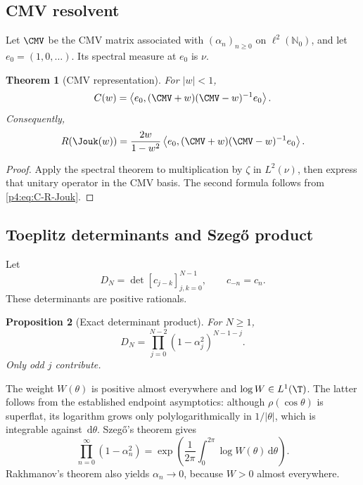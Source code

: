 \documentclass[11pt,oneside]{article}
\newtheorem{theorem}{Theorem}[section]
\newtheorem{proposition}[theorem]{Proposition}
\theoremstyle{definition}
\newcommand{\dd}{\,\mathrm d}
\newcommand{\N}{\mathbb N}
\begin{document}
\subsection{CMV resolvent}

Let \(\CMV\) be the CMV matrix associated with \((\alpha_n)_{n\ge0}\) on
\(\ell^2(\N_0)\), and let \(e_0=(1,0,\ldots)\). Its spectral measure at \(e_0\) is \(\nu\).

\begin{theorem}[CMV representation]
\label{p4:thm:CMV}
For \(|w|<1\),
\begin{equation}
 C(w)=\left\langle e_0,(\CMV+w)(\CMV-w)^{-1}e_0\right\rangle.
 \label{p4:eq:C-CMV}
\end{equation}
Consequently,
\begin{equation}
 R(\Jouk(w))=\frac{2w}{1-w^2}
 \left\langle e_0,(\CMV+w)(\CMV-w)^{-1}e_0\right\rangle.
 \label{p4:eq:R-CMV}
\end{equation}
\end{theorem}

\begin{proof}
Apply the spectral theorem to multiplication by \(\zeta\) in \(L^2(\nu)\), then express that
unitary operator in the CMV basis. The second formula follows from
\eqref{p4:eq:C-R-Jouk}.
\end{proof}

\subsection{Toeplitz determinants and Szeg\H{o} product}

Let
\begin{equation}
 D_N=\det[c_{j-k}]_{j,k=0}^{N-1},\qquad c_{-n}=c_n.
 \label{p4:eq:Toeplitz-D}
\end{equation}
These determinants are positive rationals.

\begin{proposition}[Exact determinant product]
\label{p4:prop:Toeplitz-product}
For \(N\ge1\),
\begin{equation}
 D_N=\prod_{j=0}^{N-2}(1-\alpha_j^2)^{N-1-j}.
 \label{p4:eq:Toeplitz-alpha}
\end{equation}
Only odd \(j\) contribute.
\end{proposition}

The weight \(W(\theta)\) is positive almost everywhere and
\(\log W\in L^1(\T)\). The latter follows from the established endpoint asymptotics:
although \(\rho(\cos\theta)\) is superflat, its logarithm grows only polylogarithmically in
\(1/|\theta|\), which is integrable against \(\dd\theta\). Szeg\H{o}'s theorem gives
\begin{equation}
 \boxed{\displaystyle
 \prod_{n=0}^{\infty}(1-\alpha_n^2)
 =\exp\left(\frac1{2\pi}\int_0^{2\pi}\log W(\theta)\dd\theta\right).}
 \label{p4:eq:Szego-product}
\end{equation}
Rakhmanov's theorem also yields \(\alpha_n\to0\), because \(W>0\) almost everywhere.
\end{document}
